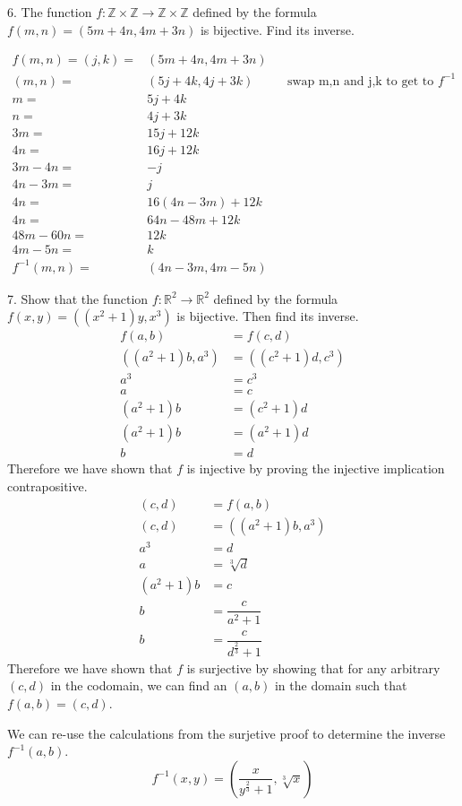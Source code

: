 \documentclass{idrisMemo}
\begin{document}
\begin{prooflist}{6. The function $f: \mathbb{Z} \times \mathbb{Z} \rightarrow
    \mathbb{Z} \times \mathbb{Z}$ defined by the formula $f(m, n)=(5 m+4 n, 4
m+3 n)$ is bijective. Find its inverse.}
\item
\begin{align*}
    f(m, n)=(j, k)=&(5 m+4 n, 4 m+3 n)\\
    (m, n)=&(5 j+4 k, 4 j+3 k)&&\text{swap m,n and j,k to get to }f^{-1}\\
    m=&5 j+4 k\\
    n=&4 j+3 k\\
    3m=&15 j+12 k\\
    4n=&16 j+12 k\\
    3m-4n=&-j\\
    4n-3m=&j\\
    4n=&16 (4n-3m)+12 k\\
    4n=&64n-48m+12 k\\
    48m-60n=&12 k\\
    4m-5n=&k\\
    f^{-1}(m, n) =& (4n-3m, 4m-5n)
\end{align*}
\end{prooflist}

\begin{prooflist}{7. Show that the function $f: \mathbb{R}^2 \rightarrow
    \mathbb{R}^2$ defined by the formula $f(x, y)=\left(\left(x^2+1\right) y,
x^3\right)$ is bijective. Then find its inverse.}
\inj{}
\begin{align*}
    f(a, b)&=f(c, d)\\
    \left(\left(a^2+1\right)b, a^3\right)&= \left(\left(c^2+1\right)d, c^3\right)\\
    a^3&=c^3\\
    a&=c\\
    (a^2+1)b &= (c^2+1)d\\
    (a^2+1)b &= (a^2+1)d\\
    b &= d
\end{align*}
Therefore we have shown that $f$ is injective by proving the injective
implication contrapositive.
\surj{}
\begin{align*}
    (c, d) &= f(a, b)\\
    (c, d) &= \left(\left(a^2+1\right)b, a^3\right)\\
    a^3&=d\\
    a&=\sqrt[3]{d}\\
    (a^2+1)b&=c\\
    b&=\dfrac{c}{a^2+1}\\
    b&=\dfrac{c}{d^{\frac{2}{3}}+1}
\end{align*}
Therefore we have shown that $f$ is surjective by showing that for any arbitrary
$(c, d)$ in the codomain, we can find an $(a, b)$ in the domain such that $f(a,
b)=(c, d)$.
\item We can re-use the calculations from the surjetive proof to determine the inverse
$f^{-1}(a, b)$.
\[f^{-1}(x, y) = \left(\dfrac{x}{y^{\frac{2}{3}}+1}, \sqrt[3]{x}\right)
\]
\end{prooflist}
\end{document}
